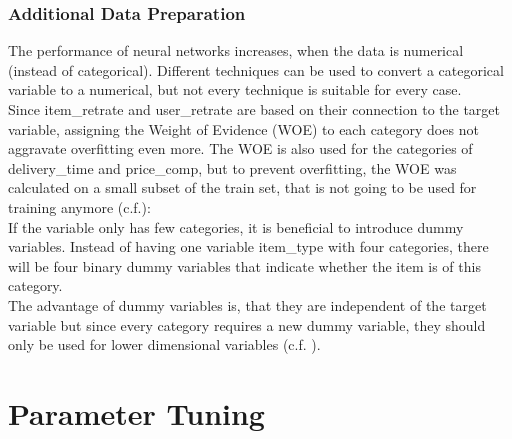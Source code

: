 \documentclass[a4paper,12pt]{article}
\begin{document}
\subsubsection{Additional Data Preparation}\label{Subsec::AddPrep}
The performance of neural networks increases, when the data is numerical (instead of categorical). Different techniques can be used to convert a categorical variable to a numerical, but not every technique is suitable for every case.\\
Since item\_retrate and user\_retrate are based on their connection to the target variable, assigning the Weight of Evidence (WOE) to each category does not aggravate overfitting even more. The WOE is also used for the categories of delivery\_time and price\_comp, but to prevent overfitting, the WOE was calculated on a small subset of the train set, that is not going to be used for training anymore (c.f.\cite{moeyersoms2015}):\\
If the variable only has few categories, it is beneficial to introduce dummy variables. Instead of having one variable item\_type with four categories, there will be four binary dummy variables that indicate whether the item is of this category. 
\\
The advantage of dummy variables is, that they are independent of the target variable but since every category requires a new dummy variable, they should only be used for lower dimensional variables (c.f. \cite{moeyersoms2015}).

\section{Parameter Tuning}
\end{document}
